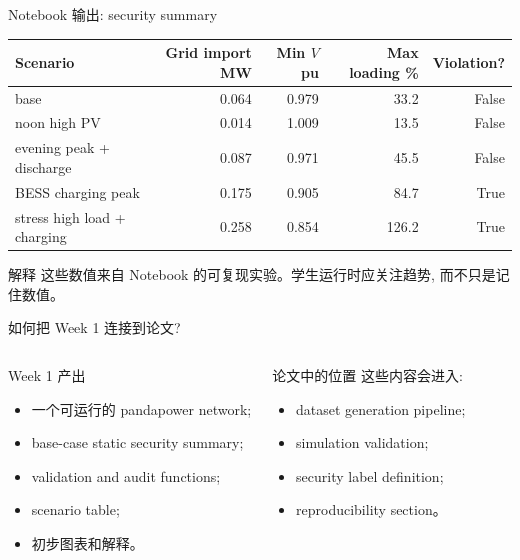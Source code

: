 \documentclass[aspectratio=169,10pt]{ctexbeamer}
\begin{document}
\begin{frame}{Notebook 输出: security summary}
\begin{table}
\centering
\scriptsize
\begin{tabular}{lrrrr}
\toprule
Scenario & Grid import MW & Min $V$ pu & Max loading \% & Violation? \\
\midrule
base & 0.064 & 0.979 & 33.2 & False \\
noon high PV & 0.014 & 1.009 & 13.5 & False \\
evening peak + discharge & 0.087 & 0.971 & 45.5 & False \\
BESS charging peak & 0.175 & 0.905 & 84.7 & True \\
stress high load + charging & 0.258 & 0.854 & 126.2 & True \\
\bottomrule
\end{tabular}
\end{table}
\begin{block}{解释}
这些数值来自 Notebook 的可复现实验。学生运行时应关注趋势, 而不只是记住数值。
\end{block}
\end{frame}

\begin{frame}{如何把 Week 1 连接到论文?}
\begin{columns}[T]
\begin{block}{Week 1 产出}
\begin{itemize}
  \item 一个可运行的 pandapower network;
  \item base-case static security summary;
  \item validation and audit functions;
  \item scenario table;
  \item 初步图表和解释。
\end{itemize}
\end{block}
\begin{block}{论文中的位置}
这些内容会进入:
\begin{itemize}
  \item dataset generation pipeline;
  \item simulation validation;
  \item security label definition;
  \item reproducibility section。
\end{itemize}
\end{block}
\end{columns}
\end{frame}
\end{document}
